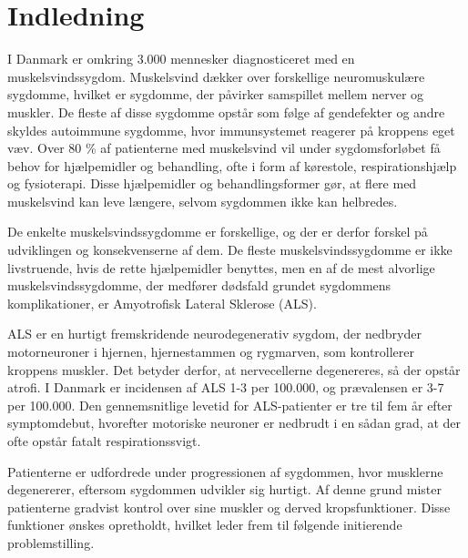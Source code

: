 \section{Indledning}



I Danmark er omkring 3.000 mennesker diagnosticeret med en muskelsvindssygdom. Muskelsvind dækker over forskellige neuromuskulære sygdomme, hvilket er sygdomme, der påvirker samspillet mellem nerver og muskler. De fleste af disse sygdomme opstår som følge af gendefekter og andre skyldes autoimmune sygdomme, hvor immunsystemet reagerer på kroppens eget væv. Over 80 \% af patienterne med muskelsvind vil under sygdomsforløbet få behov for hjælpemidler og behandling, ofte i form af kørestole, respirationshjælp og fysioterapi. Disse hjælpemidler og behandlingsformer gør, at flere med muskelsvind kan leve længere, selvom sygdommen ikke kan helbredes. \citep{hvadermuskelsvind2016,sygdomsbeskrivelser2016}

De enkelte muskelsvindssygdomme er forskellige, og der er derfor forskel på udviklingen og konsekvenserne af dem. De fleste muskelsvindssygdomme er ikke livstruende, hvis de rette hjælpemidler benyttes, men en af de mest alvorlige muskelsvindssygdomme, der medfører dødsfald grundet sygdommens komplikationer, er Amyotrofisk Lateral Sklerose (ALS).  \citep{hvadermuskelsvind2016}

ALS er en hurtigt fremskridende neurodegenerativ sygdom, der nedbryder motorneuroner i hjernen, hjernestammen og rygmarven, som kontrollerer kroppens muskler. Det betyder derfor, at nervecellerne degenereres, så der opstår atrofi. I Danmark er incidensen af ALS 1-3 per 100.000, og prævalensen er 3-7 per 100.000. Den gennemsnitlige levetid for ALS-patienter er tre til fem år efter symptomdebut, hvorefter motoriske neuroner er nedbrudt i en sådan grad, at der ofte opstår fatalt respirationssvigt. \citep{russell2015, morris2015}

Patienterne er udfordrede under progressionen af sygdommen, hvor musklerne degenererer, eftersom sygdommen udvikler sig hurtigt. Af denne grund mister patienterne gradvist kontrol over sine muskler og derved kropsfunktioner. Disse funktioner ønskes opretholdt, hvilket leder frem til følgende initierende problemstilling. 
 
